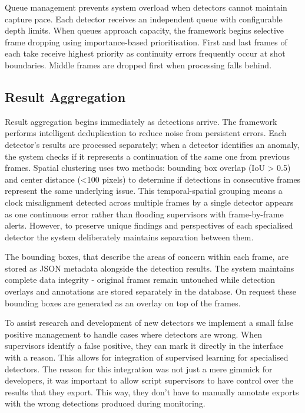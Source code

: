 Queue management prevents system overload when detectors cannot maintain capture pace. Each detector receives an independent queue with configurable depth limits. When queues approach capacity, the framework begins selective frame dropping using importance-based prioritisation. First and last frames of each take receive highest priority as continuity errors frequently occur at shot boundaries. Middle frames are dropped first when processing falls behind.

\subsection{Result Aggregation}
Result aggregation begins immediately as detections arrive. The framework performs intelligent deduplication to reduce noise from persistent errors. Each detector's results are processed separately; when a detector identifies an anomaly, the system checks if it represents a continuation of the same one from previous frames. Spatial clustering uses two methods: bounding box overlap (IoU > 0.5) and center distance (<100 pixels) to determine if detections in consecutive frames represent the same underlying issue. This temporal-spatial grouping means a clock misalignment detected across multiple frames by a single detector appears as one continuous error rather than flooding supervisors with frame-by-frame alerts. However, to preserve unique findings and perspectives of each specialised detector the system deliberately maintains separation between them.

The bounding boxes, that describe the areas of concern within each frame, are stored as JSON metadata alongside the detection results. The system maintains complete data integrity - original frames remain untouched while detection overlays and annotations are stored separately in the database. On request these bounding boxes are generated as an overlay on top of the frames.

To assist research and development of new detectors we implement a small false positive management to handle cases where detectors are wrong. When supervisors identify a false positive, they can mark it directly in the interface with a reason. This allows for integration of supervised learning for specialised detectors. The reason for this integration was not just a mere gimmick for developers, it was important to allow script supervisors to have control over the results that they export. This way, they don't have to manually annotate exports with the wrong detections produced during monitoring.

